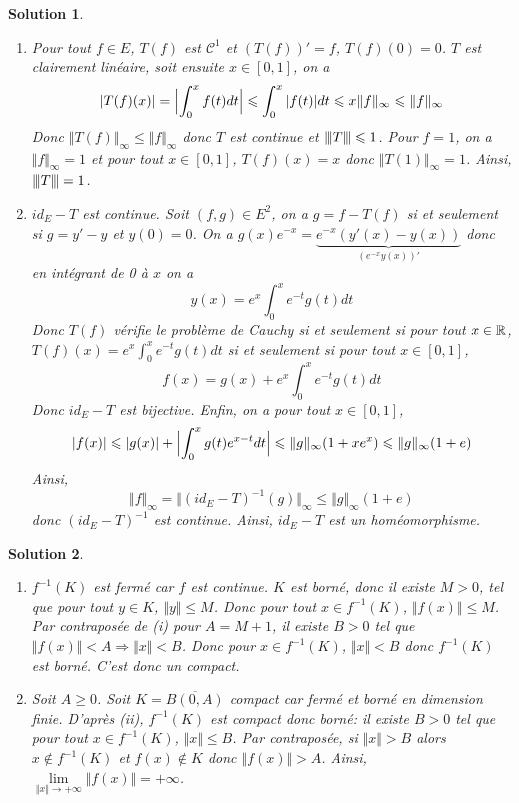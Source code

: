 \documentclass[12pt]{article}
\newtheorem{solution}{Solution}[section]
\theoremstyle{remark}
\newcommand{\vertiii}[1]{{\left\vert\kern-0.25ex\left\vert\kern-0.25ex\left\vert{}#1
\right\vert\kern-0.25ex\right\vert\kern-0.25ex\right\vert}}
\numberwithin{equation}{section}
\begin{document}
\begin{solution}
	\phantom{}
	\begin{enumerate}
		\item Pour tout $f\in E$, $T(f)$ est $\mathcal{C}^{1}$ et $(T(f))'=f$, $T(f)(0)=0$. $T$ est clairement linéaire, soit ensuite $x\in[0,1]$, on a 
		$$\vert T(f)(x)\vert=\Bigl\lvert\int_{0}^{x}f(t)dt\Bigr\rvert\leqslant\int_{0}^{x}\vert f(t)\vert dt\leqslant x\Vert f\Vert_{\infty}\leqslant\Vert f\Vert_{\infty}$$
		Donc $\Vert T(f)\Vert_{\infty}\leqslant\Vert f\Vert_{\infty}$ donc $T$ est continue et $\vertiii{T}\leqslant1$. Pour $f=1$, on a $\Vert f\Vert_{\infty}=1$ et pour tout $x\in[0,1]$, $T(f)(x)=x$ donc $\Vert T(1)\Vert_{\infty}=1$. Ainsi, $\vertiii{T}=1$.

		\item $id_{E}-T$ est continue. Soit $(f,g)\in E^{2}$, on a $g=f-T(f)$ si et seulement si $g=y'-y$ et $y(0)=0$. 
		On a $g(x)e^{-x}=\underbrace{e^{-x}(y'(x)-y(x))}_{(e^{-x}y(x))'}$ donc en intégrant de 0 à $x$ on a 
		$$y(x)=e^{x}\int_{0}^{x}e^{-t}g(t)dt$$
		Donc $T(f)$ vérifie le problème de Cauchy si et seulement si pour tout $x\in\mathbb{R}$, $T(f)(x)=e^{x}\int_{0}^{x}e^{-t}g(t)dt$ si et seulement si pour tout $x\in[0,1]$, 
		$$f(x)=g(x)+e^{x}\int_{0}^{x}e^{-t}g(t)dt$$
		Donc $id_{E}-T$ est bijective. 
		Enfin, on a pour tout $x\in[0,1]$, 
		$$\vert f(x)\vert\leqslant\vert g(x)\vert+\Bigl\lvert\int_{0}^{x}g(t)e^{x-t}dt\Bigr\rvert\leqslant\Vert g\Vert_{\infty}(1+xe^{x})\leqslant\Vert g\Vert_{\infty}(1+e)$$
		Ainsi, 
		$$\Vert f\Vert_{\infty}=\Vert(id_{E}-T)^{-1}(g)\Vert_{\infty}\leqslant\Vert g\Vert_{\infty}(1+e)$$
		donc $(id_{E}-T)^{-1}$ est continue. Ainsi, $id_{E}-T$ est un homéomorphisme.
	\end{enumerate}
\end{solution}

\begin{solution}
	\phantom{}
	\begin{enumerate}
		\item [(i) $\Rightarrow$ (ii)] $f^{-1}(K)$ est fermé car $f$ est continue. $K$ est borné, donc il existe $M>0$, tel que pour tout $y\in K$, $\Vert y\Vert\leqslant M$. Donc pour tout $x\in f^{-1}(K)$, $\Vert f(x)\Vert\leqslant M$. Par contraposée de (i) pour $A=M+1$, il existe $B>0$ tel que $\Vert f(x)\Vert<A\Rightarrow\Vert x\Vert<B$. Donc pour $x\in f^{-1}(K)$, $\Vert x\Vert<B$ donc $f^{-1}(K)$ est borné. C'est donc un compact.
		\item [(ii) $\Rightarrow$ (i)] Soit $A\geqslant0$. Soit $K=\overline{B(0,A)}$ compact car fermé et borné en dimension finie. D'après (ii), $f^{-1}(K)$ est compact donc borné: il existe $B>0$ tel que pour tout $x\in f^{-1}(K)$, $\Vert x\Vert\leqslant B$. Par contraposée, si $\Vert x\Vert>B$ alors $x\notin f^{-1}(K)$ et $f(x)\notin K$ donc $\Vert f(x)\Vert >A$. Ainsi, $\lim\limits_{\Vert x\Vert\to+\infty}\Vert f(x)\Vert=+\infty$.
	\end{enumerate}
\end{solution}
\end{document}
